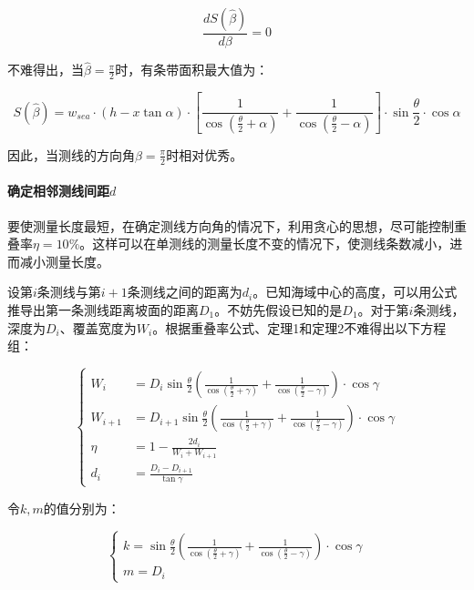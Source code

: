 \begin{equation}
    \frac{dS(\hat \beta)}{d\beta} = 0
\end{equation}

不难得出，当$\hat \beta = \frac{\pi}{2}$时，有条带面积最大值为：

\begin{equation}
    S(\hat \beta) = 
    w_{sea} \cdot (h - x\tan \alpha) \cdot \left[
        \frac{1}{\cos \left(
            \frac{\theta}{2} + \alpha
        \right)} + \frac{1}{\cos \left(
            \frac{\theta}{2} - \alpha
        \right)}
    \right]\cdot \sin \frac{\theta}{2} \cdot \cos \alpha
\end{equation}

因此，当测线的方向角$\beta = \frac{\pi}{2}$时相对优秀。

\paragraph{确定相邻测线间距$d$}

要使测量长度最短，在确定测线方向角的情况下，利用贪心的思想，尽可能控制重叠率$\eta = 10\%$。这样可以在单测线的测量长度不变的情况下，使测线条数减小，进而减小测量长度。

设第$i$条测线与第$i + 1$条测线之间的距离为$d_i$。已知海域中心的高度，可以用公式推导出第一条测线距离坡面的距离$D_1$。不妨先假设已知的是$D_1$。对于第$i$条测线，深度为$D_i$、覆盖宽度为$W_i$。根据重叠率公式、定理1和定理2不难得出以下方程组：

\begin{equation}
    \begin{cases}
        W_i & = D_i\sin\frac{\theta}{2}\left(\frac{1}{\cos(\frac{\theta}{2}+\gamma)} + \frac{1}{\cos(\frac{\theta}{2}-\gamma)}\right) \cdot \cos \gamma\\
        W_{i + 1} & = D_{i + 1}\sin\frac{\theta}{2}\left(\frac{1}{\cos(\frac{\theta}{2}+\gamma)} + \frac{1}{\cos(\frac{\theta}{2}-\gamma)}\right) \cdot \cos \gamma\\
        \eta & = 1 - \frac{2d_i}{W_i + W_{i + 1}}\\
        d_i & = \frac{D_i - D_{i + 1}}{\tan \gamma}
    \end{cases}
\end{equation}

令$k, m$的值分别为：

\begin{equation}
    \begin{cases}
        k = 
        \sin\frac{\theta}{2}\left(
            \frac{1}{\cos(\frac{\theta}{2}+\gamma)} + 
            \frac{1}{\cos(\frac{\theta}{2}-\gamma)}
        \right) \cdot \cos \gamma\\
        m = D_i
    \end{cases}
\end{equation}

